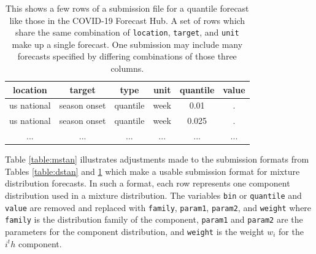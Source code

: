\documentclass[11pt,notitlepage]{isuthesis}
\begin{document}
\begin{table}[h!]
\begin{center}
\begin{minipage}{11cm}
\captionsetup{font=scriptsize}
\centering
 \begin{tabular}{|c|c|c|c|c|c|}
 \hline
    location & target & type & unit & quantile & value  \\ \hline
    us national & season onset & quantile & week & 0.01 & . \\
    us national & season onset & quantile & week & 0.025 & . \\
    ... & ... & ... & ... & ... & ... \\
 \hline
 \end{tabular}
 \caption[COVID-19 Forecast Hub competition submission example]{This shows
 a few rows of a 
 submission file
 for a quantile forecast like those in the COVID-19 Forecast Hub. 
 A set of rows which share the same combination of 
 \texttt{location}, \texttt{target}, and \texttt{unit} make up a
 single forecast. One submission may include many forecasts specified by 
 differing combinations of those three columns.}
 \label{table:qstan}
 \end{minipage}
 \end{center}
\end{table}



Table \ref{table:mstan} illustrates adjustments made to the submission formats
from 
Tables \ref{table:dstan} and \ref{table:qstan} which make a usable submission 
format for mixture distribution forecasts. In such a format, each row represents
one component distribution used in a mixture distribution.
The variables \texttt{bin} or \texttt{quantile} and \texttt{value} are removed 
and replaced with \texttt{family},
\texttt{param1}, \texttt{param2}, and \texttt{weight} where \texttt{family} is 
the distribution family of the component,
\texttt{param1} and \texttt{param2} are the parameters for the component 
distribution, and \texttt{weight} is the 
weight $w_i$ for the $i^th$ component.
\end{document}
